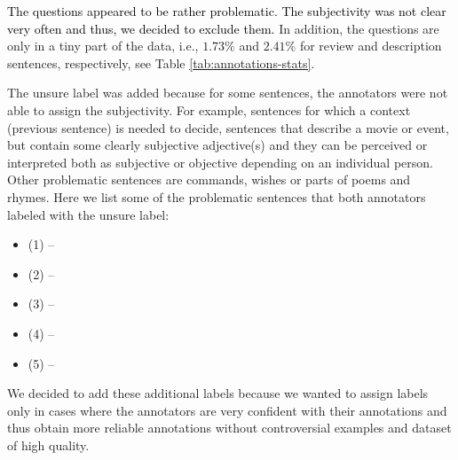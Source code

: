 \documentclass[10pt, a4paper]{article}
\begin{document}
\par \textcolor{black}{The questions appeared to be rather problematic. The subjectivity was not clear very often and thus, we decided to exclude them.} In addition, the questions are only in a tiny part of the data, i.e., $1.73\%$ and $2.41\%$ for review and description sentences, respectively, see Table \ref{tab:annotations-stats}.







\par The unsure label was added because for some sentences, the annotators were not able to assign the subjectivity. For example,
sentences for which a context (previous sentence) is needed to decide, sentences that describe a movie or event, but contain some clearly subjective adjective(s) and they can be perceived or interpreted both as subjective or objective depending on an individual person. Other problematic sentences are commands, wishes or parts of poems and rhymes. Here we list some of the problematic sentences that both annotators labeled with the unsure label:

\begin{itemize}
	\small
	\item[] {(1)  -- }
	
\item[] {(2)  -- }
	
	\item[] {(3)  -- }
	
\item[] {(4)  -- }
	
	\item[] {(5)  -- }
\end{itemize}

\par We decided to add these additional labels because we wanted to assign labels only in cases where the annotators are very confident with their annotations and thus obtain more reliable annotations without controversial examples and dataset of high quality.   
\end{document}

